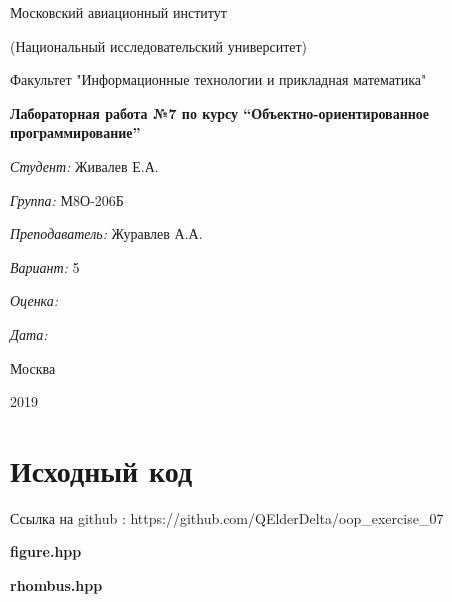 \documentclass[a4paper, 12pt]{article}
\begin{document}
\thispagestyle{empty}	
\begin{center}
	Московский авиационный институт
	
	(Национальный исследовательский университет)
	
	Факультет "Информационные технологии и прикладная математика"
	
\end{center}
\vspace{40ex}
\begin{center}
	\textbf{\large{Лабораторная работа №7 по курсу \textquotedblleft Объектно-ориентированное программирование\textquotedblright}}
\end{center}
\vspace{40ex}
\begin{flushright}
	\textit{Студент: } Живалев Е.А.
	
	\vspace{2ex}
	\textit{Группа: } М8О-206Б
	
	\vspace{2ex}
	\textit{Преподаватель: } Журавлев А.А.
	
	\vspace{2ex}
	\textit{Вариант: } 5
	
	\vspace{2ex}
	\textit{Оценка: } \underline{\quad\quad\quad\quad\quad\quad}
	
	 \vspace{2ex}
	\textit{Дата: } \underline{\quad\quad\quad\quad\quad\quad}
	
\end{flushright}

\begin{vfill}
	\begin{center}
		Москва
		
		2019
	\end{center}	
\end{vfill}
\newpage
\section{Исходный код}

Ссылка на github : https://github.com/QElderDelta/oop\_exercise\_07

\vspace{3ex}
\textbf{\large{figure.hpp}}


\vspace{3ex}
\textbf{\large{rhombus.hpp}}

\end{document}

